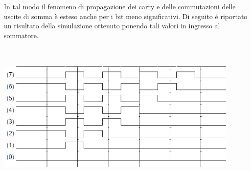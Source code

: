 \documentclass[11pt,  english, makeidx, a4paper, titlepage, oneside]{book}
\begin{document}
\vspace{0.3cm}
In tal modo il fenomeno di propagazione dei carry e delle commutazioni delle uscite di somma è esteso anche per i bit meno significativi. Di seguito è riportato un risultato della simulazione ottenuto ponendo tali valori in ingresso al sommatore.
\\\\\\
\centerline{\includegraphics[width=12cm]{./img/Lab_1/Es_2/Worst_case_nostro.png}}
\newpage
\end{document}
